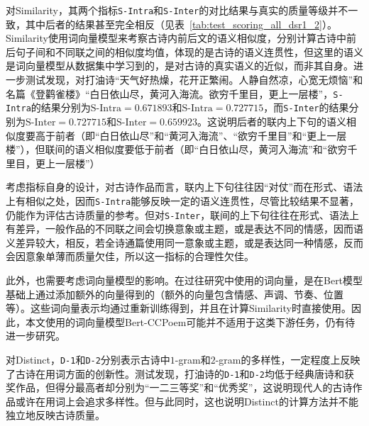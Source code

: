 对Similarity，其两个指标\verb|S-Intra|和\verb|S-Inter|的对比结果与真实的质量等级并不一致，其中后者的结果甚至完全相反（见表~\ref{tab:test_scoring_all_dsr1_2}）。Similarity使用词向量模型来考察古诗内前后文的语义相似度，分别计算古诗中前后句子间和不同联之间的相似度均值，体现的是古诗的语义连贯性，但这里的语义是词向量模型从数据集中学习到的，是对古诗的真实语义的近似，而非其自身。进一步测试发现，对打油诗“{\kaishu 天气好热燥，花开正繁闹。人静自然凉，心宽无烦恼}”和名篇《登鹳雀楼》“{\kaishu 白日依山尽，黄河入海流。欲穷千里目，更上一层楼}”，\verb|S-Intra|的结果分别为$\text{S-Intra}=0.671893$和$\text{S-Intra}=0.727715$，而\verb|S-Inter|的结果分别为$\text{S-Inter}=0.727715$和$\text{S-Inter}=0.659923$。这说明后者的联内上下句的语义相似度要高于前者（即“{\kaishu 白日依山尽}”和“{\kaishu 黄河入海流}”、“{\kaishu 欲穷千里目}”和“{\kaishu 更上一层楼}”），但联间的语义相似度要低于前者（即“{\kaishu 白日依山尽，黄河入海流}”和“{\kaishu 欲穷千里目，更上一层楼}”）

考虑指标自身的设计，对古诗作品而言，联内上下句往往因“对仗”而在形式、语法上有相似之处，因而\verb|S-Intra|能够反映一定的语义连贯性，尽管比较结果不显著，仍能作为评估古诗质量的参考。但对\verb|S-Inter|，联间的上下句往往在形式、语法上有差异，一般作品的不同联之间会切换意象或主题，或是表达不同的情感，因而语义差异较大，相反，若全诗通篇使用同一意象或主题，或是表达同一种情感，反而会因意象单薄而质量欠佳，所以这一指标的合理性欠佳。

此外，也需要考虑词向量模型的影响。在过往研究中使用的词向量，是在Bert模型基础上通过添加额外的向量得到的（额外的向量包含情感、声调、节奏、位置等）。这些词向量表示均通过重新训练得到，并且在计算Similarity时直接使用。因此，本文使用的词向量模型Bert-CCPoem可能并不适用于这类下游任务，仍有待进一步研究。


对Distinct，\verb|D-1|和\verb|D-2|分别表示古诗中$1$-gram和$2$-gram的多样性，一定程度上反映了古诗在用词方面的创新性。测试发现，打油诗的\verb|D-1|和\verb|D-2|均低于经典唐诗和获奖作品，但得分最高者却分别为“一二三等奖”和“优秀奖”，这说明现代人的古诗作品或许在用词上会追求多样性。但与此同时，这也说明Distinct的计算方法并不能独立地反映古诗质量。

